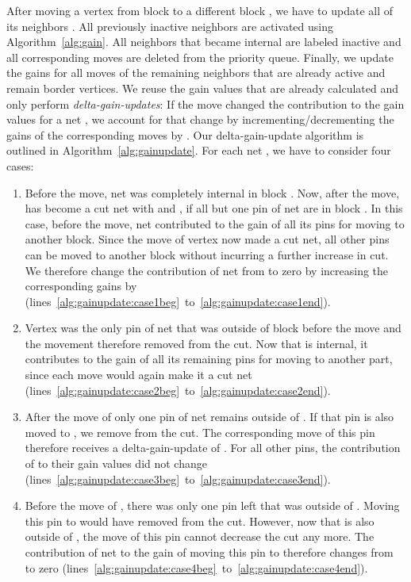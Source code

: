 \documentclass[runningheads,a4paper]{llncs}
\newcommand{\sschl}[1]{{\color{ForestGreen}[SS: #1]}}
\renewcommand{\sschl}[1]{}
\begin{document}
After moving a vertex  from block  to a different block , we have to update all of its neighbors  . 
All previously inactive neighbors are activated using Algorithm~\ref{alg:gain}. 
All neighbors that became internal are labeled inactive and all corresponding moves are deleted from the priority queue.
Finally,  we update the gains for all moves of the remaining neighbors that are already active and remain border vertices. 
We reuse the gain values that are already calculated and only perform \emph{delta-gain-updates}: 
If the move changed the contribution to the gain values for a net , we
account for that change by incrementing/decrementing the gains of the corresponding moves by . 
Our delta-gain-update algorithm is outlined in Algorithm~\ref{alg:gainupdate}. For each net , we have to consider four cases: \sschl{For TR, i could make a picture to show these cases}

\begin{enumerate}
\item Before the move, net  was completely internal in block . Now, after the move,  has become a cut net with  and , if all but one pin of net  are in block .
  In this case, before the move, net  contributed  to the gain of all its pins for moving to another block.
  Since the move of vertex  now made  a cut net, all other pins can be moved to another block without incurring a further increase in cut. We therefore change the contribution
  of net  from  to zero by increasing the corresponding gains by  (lines~\ref{alg:gainupdate:case1beg}~to~\ref{alg:gainupdate:case1end}).
\item Vertex  was the only pin of net  that was outside of block  before the move and the movement therefore removed  from the cut. 
  Now that  is internal, it contributes  to the gain of all its remaining pins for moving to another part, 
  since each move would again make it a cut net (lines~\ref{alg:gainupdate:case2beg}~to~\ref{alg:gainupdate:case2end}).
\item After the move of  only one pin of net  remains outside of . If that pin is also moved to , we remove  from the cut. 
  The corresponding move of this pin therefore receives a delta-gain-update of . For all other pins, the contribution of  to their gain values did not change 
  (lines~\ref{alg:gainupdate:case3beg}~to~\ref{alg:gainupdate:case3end}).
\item Before the move of , there was only one pin left that was outside of . Moving this pin to  would have removed  from the cut.
  However, now that  is also outside of , the move of this pin cannot decrease the cut any more. The contribution of net  to the gain of moving this pin to  
  therefore changes from  to zero (lines~\ref{alg:gainupdate:case4beg}~to~\ref{alg:gainupdate:case4end}).
\end{enumerate}
\end{document}
